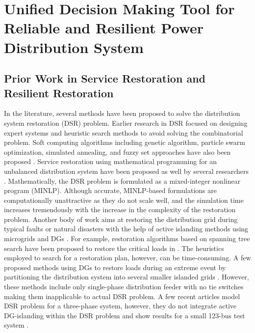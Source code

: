 \documentclass[12pt]{article}
\begin{document}
\section{Unified Decision Making Tool for Reliable and Resilient Power Distribution System}
\subsection{Prior Work in Service Restoration and Resilient Restoration}
   In the literature, several methods have been proposed to solve the distribution system restoration (DSR) problem. Earlier research in DSR focused on designing expert systems and heuristic search methods \cite{liu1988expert,teo1994restoration,miu2000multi} to avoid solving the combinatorial problem.  Soft computing algorithms including genetic algorithm, particle swarm optimization, simulated annealing, and fuzzy set approaches have also been proposed \cite{kumar2006service, li2008hybrid,jeon2002efficient, kuo1993distribution}. Service restoration using mathematical programming for an unbalanced distribution system have been proposed as well by several researchers \cite{lei2000network,khushalani2007optimized,wang2015self}. Mathematically, the DSR problem is formulated as a mixed-integer nonlinear program (MINLP). Although accurate, MINLP-based formulations are computationally unattractive as they do not scale well, and the simulation time increases tremendously with the increase in the complexity of the restoration problem. Another body of work aims at restoring the distribution grid during typical faults or natural disasters with the help of active islanding methods using microgrids and DGs \cite{li2014distribution, gao2016resilience,chen2016resilient}. For example, restoration algorithms based on spanning tree search have been proposed to restore the critical loads in \cite{li2014distribution, gao2016resilience}. The heuristics employed to search for a restoration plan, however, can be time-consuming. A few proposed methods using DGs to restore loads during an extreme event by partitioning the distribution system into several smaller islanded grids \cite{chen2016resilient,chen2018multi,8421054}. However, these methods include only single-phase distribution feeder with no tie switches making them inapplicable to actual DSR problem. A few recent articles model DSR problem for a three-phase system, however, they do not integrate active DG-islanding within the DSR problem and show results for a small 123-bus test system \cite{chen2018sequential}.
\end{document}
